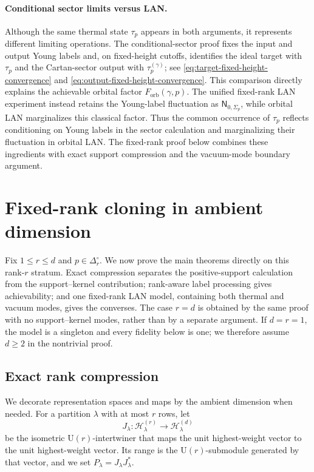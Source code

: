 \documentclass[11pt]{article}
\theoremstyle{remark}
\theoremstyle{plain}
\newcommand{\cH}{\mathcal H}
\newcommand{\U}{\mathrm U}
\newcommand{\Forb}{F_{\mathrm{orb}}}
\begin{document}
\paragraph{Conditional sector limits versus LAN.}
Although the same thermal state \(\tau_p\) appears in both arguments, it
represents different limiting operations.  The conditional-sector proof
fixes the input and output Young labels and, on fixed-height cutoffs,
identifies the ideal target with \(\tau_p\) and the Cartan-sector output with
\(\tau_p^{(\gamma)}\); see
\eqref{eq:target-fixed-height-convergence} and
\eqref{eq:output-fixed-height-convergence}.  This comparison directly
explains the achievable orbital factor \(\Forb(\gamma,p)\).
The unified fixed-rank LAN experiment instead
retains the Young-label fluctuation as
  \(\mathsf N_{0,\Sigma_p}\), while orbital LAN marginalizes this classical
factor.  Thus the common occurrence of \(\tau_p\) reflects conditioning on
Young labels in the sector calculation and marginalizing their fluctuation
in orbital LAN.  The fixed-rank proof below combines these ingredients with
exact support compression and the vacuum-mode boundary argument.

\section{Fixed-rank cloning in ambient dimension}
\label{sec:fixed-rank-proof}
Fix \(1\le r\le d\) and \(p\in\Delta_r^\circ\).  We now prove the main
theorems directly on this rank-\(r\) stratum.  Exact compression separates
the positive-support calculation from the support--kernel contribution;
rank-aware label processing gives achievability; and one fixed-rank LAN
model, containing both thermal and vacuum modes, gives the converses.  The
case \(r=d\) is obtained by the same proof with no support--kernel modes,
rather than by a separate argument.
If \(d=r=1\), the model is a singleton and every fidelity below is one; we
therefore assume \(d\ge2\) in the nontrivial proof.
\subsection{Exact rank compression}\label{sec:compression}
We decorate representation spaces and maps by the ambient dimension when
needed.  For a partition \(\lambda\) with at most \(r\) rows, let
\[
  J_\lambda:\cH_\lambda^{(r)}\longrightarrow\cH_\lambda^{(d)}
\]
be the isometric \(\U(r)\)-intertwiner that maps the unit highest-weight
vector to the unit highest-weight vector.  Its range is the
\(\U(r)\)-submodule generated by that vector, and we set
\(P_\lambda=J_\lambda J_\lambda^*\).
\end{document}
